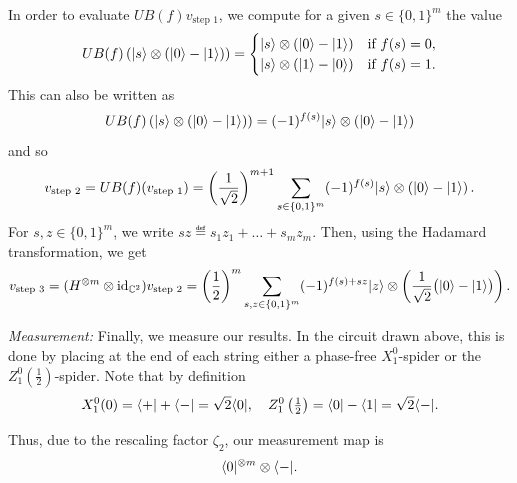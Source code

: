 \documentclass[a4paper, oneside, 12pt]{amsart}
\begin{document}
In order to evaluate \(UB(f) v_{\text{step 1}}\), we compute for a given \( s \in \{0,1\}^m \) the value
\begin{equation*}
  UB(f) \left( \lvert s\rangle \otimes \left( \lvert0\rangle - \lvert1\rangle \right) \right) =
  \begin{cases}
    \lvert s\rangle \otimes \left( \lvert0\rangle - \lvert1\rangle \right) & \text{if } f(s) = 0, \\
    \lvert s\rangle \otimes \left( \lvert1\rangle - \lvert0\rangle \right) & \text{if } f(s) = 1.
  \end{cases}
\end{equation*}
This can also be written as
\begin{equation*}
  UB(f) \left( \lvert s\rangle \otimes \left( \lvert0\rangle - \lvert1\rangle \right) \right) = (-1)^{f(s)} \lvert s\rangle \otimes \left( \lvert0\rangle - \lvert1\rangle \right)
\end{equation*}
and so
\begin{equation*}
  v_{\text{step 2}}
  = UB(f)(v_{\text{step 1}})
  = \left( \frac{1}{\sqrt{2}} \right)^{m+1} \sum_{s \in \{0,1\}^m} (-1)^{f(s)} \lvert s\rangle \otimes \left( \lvert0\rangle - \lvert1\rangle \right).
\end{equation*}
For \( s, z \in \{0,1\}^m \), we write \( sz \eqdef s_1 z_1 + \dots + s_m z_m \).
Then, using the Hadamard transformation, we get
\begin{equation*}
  v_{\text{step 3}}
  = (H^{\otimes m} \otimes \mathrm{id}_{\mathbb{C}^2}) v_{\text{step 2}}
  = \left( \frac{1}{2} \right)^m \sum_{s, z \in \{0,1\}^m} (-1)^{f(s) + sz} \lvert z\rangle \otimes \left( \frac{1}{\sqrt{2}} \big( \lvert0\rangle - \lvert1\rangle \big) \right).
\end{equation*}
\medskip

\noindent
\textit{Measurement:}
Finally, we measure our results.
In the circuit drawn above, this is done by placing at the end of each string either a phase-free \( X_1^0 \)-spider or the \( Z_1^0(\tfrac{1}{2}) \)-spider.
Note that by definition
\begin{equation*}
  X_1^0(0) = \langle+\rvert + \langle-\rvert = \sqrt{2} \langle0\rvert, \quad Z_1^0\left(\tfrac{1}{2}\right) = \langle0\rvert - \langle1\rvert = \sqrt{2} \langle-\rvert.
\end{equation*}

Thus, due to the rescaling factor \(\zeta_{2}\), our measurement map is
\begin{equation*}
  \langle0\rvert^{\otimes m} \otimes \langle-\rvert.
\end{equation*}
\end{document}
